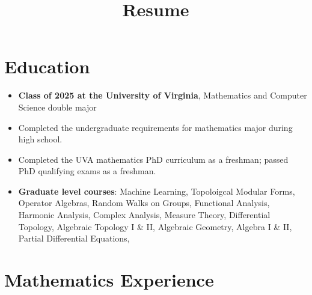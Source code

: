 \documentclass[11pt,letterpaper,sans]{moderncv}
\title{Resume}
\begin{document}
\makecvtitle %
\vspace*{-3.5em}


%

\section{Education}

\begin{itemize}
  \item \textbf{Class of 2025 at the University of Virginia}, Mathematics and Computer Science double major
  \item Completed the undergraduate requirements for mathematics major during high school.
  \item Completed the UVA mathematics PhD curriculum as a freshman; passed PhD qualifying exams as a freshman.
  \item \textbf{Graduate level courses}: Machine Learning, Topoloigcal Modular Forms, Operator Algebras, Random Walks on Groups, Functional Analysis, Harmonic Analysis, Complex Analysis, Measure Theory, Differential Topology, Algebraic Topology I \& II, Algebraic Geometry, Algebra I \& II, Partial Differential Equations, 
\end{itemize}



\section{Mathematics Experience}

\end{document}
